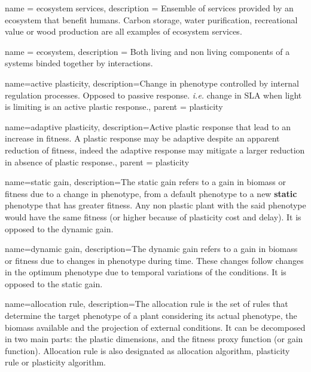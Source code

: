 



{
name = ecosystem services,
description = {Ensemble of services provided by an ecosystem that benefit humans. Carbon storage, water purification, recreational value or wood production are all examples of ecosystem services.} 
}


{
name = ecosystem,
description = {Both living and non living components of a systems binded together by interactions.} 
}




{
    name=active plasticity,
    description={Change in phenotype controlled by internal regulation processes. Opposed to passive response. \textit{i.e.} change in SLA when light is limiting is an active plastic response.},
    parent = plasticity
    }


{
    name=adaptive plasticity,
    description={Active plastic response that lead to an increase in fitness. A plastic response may be adaptive despite an apparent reduction of fitness, indeed the adaptive response may mitigate a larger reduction in absence of plastic response.},
    parent = plasticity
    }

%


{
    name=static gain,
    description={The static gain refers to a gain in biomass or fitness due to a change in phenotype, from a default phenotype to a new \textbf{static} phenotype that has greater fitness. Any non plastic plant with the said phenotype would have the same fitness (or higher because of plasticity cost and delay). It is opposed to the dynamic gain.}
    }
    
{
    name=dynamic gain,
    description={The dynamic gain refers to a gain in biomass or fitness due to changes in phenotype during time. These changes follow changes in the optimum phenotype due to temporal variations of the conditions. It is opposed to the static gain.}
    }


{
    name=allocation rule,
    description={The allocation rule is the set of rules that determine the target phenotype of a plant considering its actual phenotype, the biomass available and the projection of external conditions. It can be decomposed in two main parts: the plastic dimensions, and the fitness proxy function (or gain function). Allocation rule is also designated as allocation algorithm, plasticity rule or plasticity algorithm.}
}